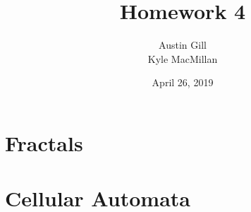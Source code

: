 \documentclass[12pt]{article}
\title{Homework 4}
\author{Austin Gill \\ Kyle MacMillan}
\date{April 26, 2019}
\begin{document}
\maketitle
\begingroup
\hypersetup{linkcolor=black}
\tableofcontents
\listoftodos
\endgroup
\newpage

\part{Fractals}




\part{Cellular Automata}


\end{document}
